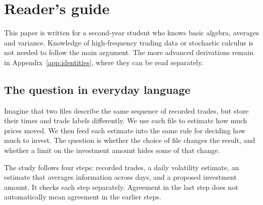 \section*{Reader's guide}
This paper is written for a second-year student who knows basic algebra, averages and variance. Knowledge of high-frequency trading data or stochastic calculus is not needed to follow the main argument. The more advanced derivations remain in Appendix~\ref{app:identities}, where they can be read separately.

\subsection*{The question in everyday language}
Imagine that two files describe the same sequence of recorded trades, but store their times and trade labels differently. We use each file to estimate how much prices moved. We then feed each estimate into the same rule for deciding how much to invest. The question is whether the choice of file changes the result, and whether a limit on the investment amount hides some of that change.

The study follows four steps: recorded trades, a daily volatility estimate, an estimate that averages information across days, and a proposed investment amount. It checks each step separately. Agreement in the last step does not automatically mean agreement in the earlier steps.

